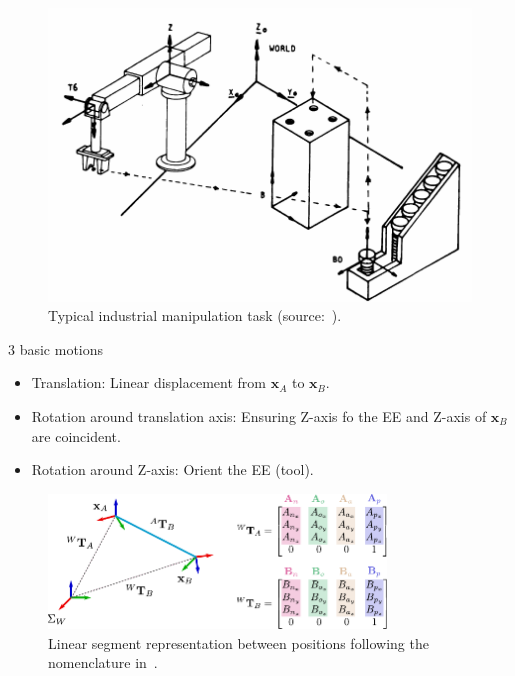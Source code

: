 \documentclass[10pt, aspectratio=169]{beamer}
\theoremstyle{remark}
\theoremstyle{definition}
\begin{document}
\begin{frame}[allowframebreaks]
\begin{center}
    \begin{minipage}{.45\linewidth}
        \begin{figure}
            \centering
            \includegraphics[width = 1\textwidth]{images/industrial_manipulator_task.pdf}
            \caption{Typical industrial manipulation task (source:~\cite{luh1983conventional}).}
        \end{figure}
    \end{minipage}%
    \hspace{0.5cm}
    \begin{minipage}{.5\linewidth}
    3 basic motions
    \begin{itemize}
        \item Translation: Linear displacement from $\mathbf{x}_A$ to $\mathbf{x}_B$.
        \item Rotation around translation axis: Ensuring Z-axis fo the EE and Z-axis of $\mathbf{x}_B$ are coincident.
        \item Rotation around Z-axis: Orient the EE (tool).  
    \end{itemize}
    \end{minipage}
\end{center}

\framebreak

\begin{figure}
    \centering
    \includegraphics[width = 0.8\textwidth]{images/linear_segment.pdf}
    \caption{Linear segment representation between positions following the nomenclature in~\cite{paul1979manipulator}.}
\end{figure}


\end{frame}
\end{document}
